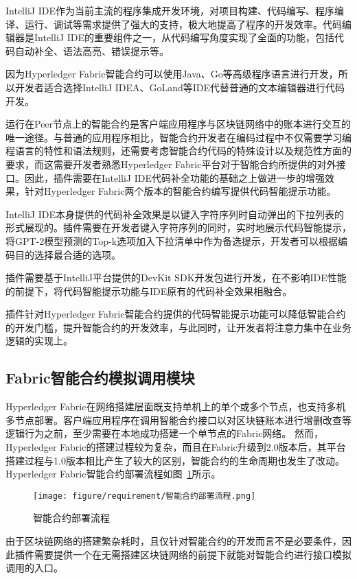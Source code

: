 IntelliJ IDE作为当前主流的程序集成开发环境，对项目构建、代码编写、程序编译、运行、调试等需求提供了强大的支持，极大地提高了程序的开发效率。代码编辑器是IntelliJ IDE的重要组件之一，从代码编写角度实现了全面的功能，包括代码自动补全、语法高亮、错误提示等。

因为Hyperledger Fabric智能合约可以使用Java、Go等高级程序语言进行开发，所以开发者适合选择IntelliJ IDEA、GoLand等IDE代替普通的文本编辑器进行代码开发。

运行在Peer节点上的智能合约是客户端应用程序与区块链网络中的账本进行交互的唯一途径。与普通的应用程序相比，智能合约开发者在编码过程中不仅需要学习编程语言的特性和语法规则，还需要考虑智能合约代码的特殊设计以及规范性方面的要求，而这需要开发者熟悉Hyperledger Fabric平台对于智能合约所提供的对外接口。因此，插件需要在IntelliJ IDE代码补全功能的基础之上做进一步的增强效果，针对Hyperledger Fabric两个版本的智能合约编写提供代码智能提示功能。

IntelliJ IDE本身提供的代码补全效果是以键入字符序列时自动弹出的下拉列表的形式展现的。插件需要在开发者键入字符序列的同时，实时地展示代码智能提示，将GPT-2模型预测的Top-k选项加入下拉清单中作为备选提示，开发者可以根据编码目的选择最合适的选项。

插件需要基于IntelliJ平台提供的DevKit SDK开发包进行开发，在不影响IDE性能的前提下，将代码智能提示功能与IDE原有的代码补全效果相融合。

插件针对Hyperledger Fabric智能合约提供的代码智能提示功能可以降低智能合约的开发门槛，提升智能合约的开发效率，与此同时，让开发者将注意力集中在业务逻辑的实现上。

\subsection{Fabric智能合约模拟调用模块}

Hyperledger Fabric在网络搭建层面既支持单机上的单个或多个节点，也支持多机多节点部署。客户端应用程序在调用智能合约接口以对区块链账本进行增删改查等逻辑行为之前，至少需要在本地成功搭建一个单节点的Fabric网络。
然而，Hyperledger Fabric的搭建过程较为复杂，而且在Fabric升级到2.0版本后，其平台搭建过程与1.0版本相比产生了较大的区别，智能合约的生命周期也发生了改动。
Hyperledger Fabric智能合约部署流程如图~\ref{fig:3.2}所示。

\begin{figure}[htb]
  \centering
  \texttt{[image: figure/requirement/智能合约部署流程.png]}
  \caption{智能合约部署流程}\label{fig:3.2}
\end{figure}

由于区块链网络的搭建繁杂耗时，且仅针对智能合约的开发而言不是必要条件，因此插件需要提供一个在无需搭建区块链网络的前提下就能对智能合约进行接口模拟调用的入口。

